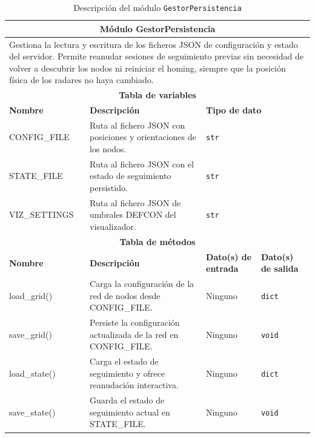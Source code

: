 \begin{table}[h!]
\centering
\small
\renewcommand{\arraystretch}{1.25}
\begin{tabular}{|p{2.8cm}|p{5.5cm}|p{2.8cm}|p{1.7cm}|}
\hline
\multicolumn{4}{|c|}{\textbf{Módulo GestorPersistencia}} \\
\hline
\multicolumn{4}{|p{12.8cm}|}{Gestiona la lectura y escritura de los ficheros JSON
de configuración y estado del servidor. Permite reanudar sesiones de seguimiento
previas sin necesidad de volver a descubrir los nodos ni reiniciar el homing,
siempre que la posición física de los radares no haya cambiado.} \\
\hline
\multicolumn{4}{|c|}{\textbf{Tabla de variables}} \\
\hline
\textbf{Nombre} & \textbf{Descripción} & \multicolumn{2}{l|}{\textbf{Tipo de dato}} \\
\hline
CONFIG\_FILE & Ruta al fichero JSON con posiciones y orientaciones de los nodos. & \multicolumn{2}{l|}{\texttt{str}} \\
\hline
STATE\_FILE & Ruta al fichero JSON con el estado de seguimiento persistido. & \multicolumn{2}{l|}{\texttt{str}} \\
\hline
VIZ\_SETTINGS & Ruta al fichero JSON de umbrales DEFCON del visualizador. & \multicolumn{2}{l|}{\texttt{str}} \\
\hline
\multicolumn{4}{|c|}{\textbf{Tabla de métodos}} \\
\hline
\textbf{Nombre} & \textbf{Descripción} & \textbf{Dato(s) de entrada} & \textbf{Dato(s) de salida} \\
\hline
load\_grid() & Carga la configuración de la red de nodos desde CONFIG\_FILE. & Ninguno & \texttt{dict} \\
\hline
save\_grid() & Persiste la configuración actualizada de la red en CONFIG\_FILE. & Ninguno & \texttt{void} \\
\hline
load\_state() & Carga el estado de seguimiento y ofrece reanudación interactiva. & Ninguno & \texttt{dict} \\
\hline
save\_state() & Guarda el estado de seguimiento actual en STATE\_FILE. & Ninguno & \texttt{void} \\
\hline
\end{tabular}
\caption{Descripción del módulo \texttt{GestorPersistencia}}
\label{tab:module_persistencia}
\end{table}
